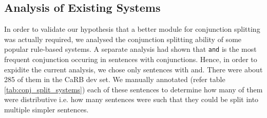     \subsection{Analysis of Existing Systems}
        In order to validate our hypothesis that a better module for conjunction splitting was actually required, we analysed the conjunction splitting ability of some popular rule-based systems. A separate analysis had shown that \verb|and| is the most frequent conjunction occuring in sentences with conjunctions. Hence, in order to expidite the current analysis, we chose only sentences with and. There were about 285 of them in the CaRB dev set. We manually annotated (refer table \ref{tab:conj_split_systems}) each of these sentences to determine how many of them were distributive i.e. how many sentences were such that they could be split into multiple simpler sentences.

        \begin{table}[h]
            \centering
            \caption{Conjunction Splitting in Existing Rule-Based Systems}
            \label{tab:conj_split_systems}
        \end{table}

